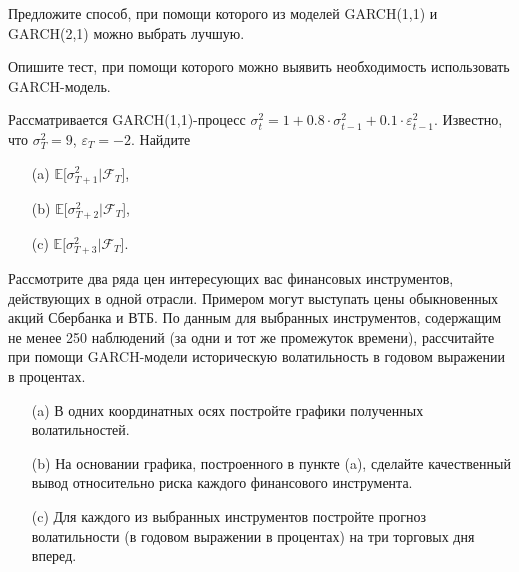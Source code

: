 \documentclass[pdftex,11pt,openany]{book}\usepackage[]{graphicx}\usepackage[]{color}
\begin{document}
\begin{solution}
\end{solution}



\begin{problem}
Предложите способ, при помощи которого из моделей GARCH(1,1) и GARCH(2,1) можно выбрать лучшую.
\end{problem}

\begin{solution}
\end{solution}

\begin{problem}
Опишите тест, при помощи которого можно выявить необходимость использовать GARCH-модель.
\end{problem}

\begin{solution}
\end{solution}



\begin{problem}
Рассматривается GARCH(1,1)-процесс $\sigma_t^2 = 1 + 0.8 \cdot \sigma_{t-1}^2 + 0.1 \cdot \varepsilon_{t-1}^2$. Известно, что $\sigma_T^2 = 9$, $\varepsilon_T = -2$. Найдите
\begin{itemize}
  \item[(a)] $\mathbb{E}[\sigma_{T+1}^2|\mathcal{F}_T$],
  \item[(b)] $\mathbb{E}[\sigma_{T+2}^2|\mathcal{F}_T$],
  \item[(c)] $\mathbb{E}[\sigma_{T+3}^2|\mathcal{F}_T$].
\end{itemize}
\end{problem}

\begin{solution}
\end{solution}


\begin{problem}
Рассмотрите два ряда цен интересующих вас финансовых инструментов, действующих в одной отрасли. Примером могут выступать цены обыкновенных акций Сбербанка и ВТБ. По данным для выбранных инструментов, содержащим не менее 250 наблюдений (за одни и тот же промежуток времени), рассчитайте при помощи GARCH-модели историческую волатильность в годовом выражении в процентах.
\begin{itemize}
  \item[(a)] В одних координатных осях постройте графики полученных волатильностей.
  \item[(b)] На основании графика, построенного в пункте (a), сделайте качественный вывод относительно риска каждого финансового инструмента.
  \item[(c)] Для каждого из выбранных инструментов постройте прогноз волатильности (в годовом выражении в процентах) на три торговых дня вперед.
\end{itemize}
\end{problem}
\end{document}
